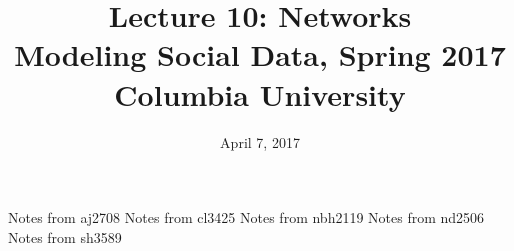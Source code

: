 \documentclass{article}
\title{
Lecture 10: Networks \\  %
Modeling Social Data, Spring 2017 \\   %
Columbia University                    %
}
\date{April 7, 2017}                %
\makeatletter
\let\org@subfile
\renewcommand*{}[1]{%
  \filename@parse{#1}%
  \expandafter
  \graphicspath\expandafter{\expandafter{\filename@area}}%
  \org@subfile{#1}%
}
\makeatother
\begin{document}
\maketitle


\pagebreak \newpage \noindent\Huge{Notes from aj2708} \normalsize \setcounter{section}{0} 
\pagebreak \newpage \noindent\Huge{Notes from cl3425} \normalsize \setcounter{section}{0} 
\pagebreak \newpage \noindent\Huge{Notes from nbh2119} \normalsize \setcounter{section}{0} 
\pagebreak \newpage \noindent\Huge{Notes from nd2506} \normalsize \setcounter{section}{0} 
\pagebreak \newpage \noindent\Huge{Notes from sh3589} \normalsize \setcounter{section}{0} 
\end{document}
